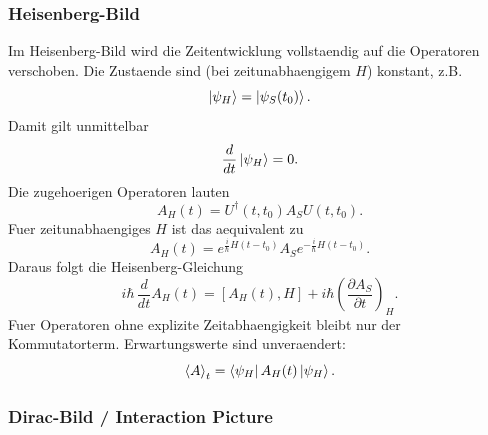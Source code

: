 \subsubsection*{Heisenberg-Bild}

Im Heisenberg-Bild wird die Zeitentwicklung
vollstaendig auf die Operatoren verschoben. Die
Zustaende sind (bei zeitunabhaengigem $H$)
konstant, z.B.
\begin{equation}
  \left|\psi_H\right\rangle=\left|\psi_S(t_0)\right\rangle.
\end{equation}
Damit gilt unmittelbar
\begin{equation}
  \frac{d}{dt}\left|\psi_H\right\rangle=0.
\end{equation}
Die zugehoerigen Operatoren lauten
\begin{equation}
  A_H(t)=U^{\dagger}(t,t_0)A_SU(t,t_0).
\end{equation}
Fuer zeitunabhaengiges $H$ ist das aequivalent zu
\begin{equation}
  A_H(t)=e^{\frac{i}{\hbar}H(t-t_0)}A_Se^{-\frac{i}{\hbar}H(t-t_0)}.
\end{equation}
Daraus folgt die Heisenberg-Gleichung
\begin{equation}
  i\hbar\,\frac{d}{dt}A_H(t)=\left[A_H(t),H\right]+i\hbar\left(\frac{\partial A_S}{\partial t}\right)_H.
\end{equation}
Fuer Operatoren ohne explizite Zeitabhaengigkeit bleibt nur der Kommutatorterm. Erwartungswerte sind unveraendert:
\begin{equation}
  \left\langle A\right\rangle_t=\left\langle\psi_H\right|A_H(t)\left|\psi_H\right\rangle.
\end{equation}

\subsubsection*{Dirac-Bild / Interaction Picture}

